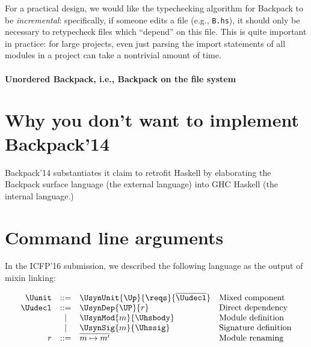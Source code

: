 For a practical design, we would like the typechecking
algorithm for Backpack to be \emph{incremental}: specifically, if
someone edits a file (e.g., \verb|B.hs|), it should only be
necessary to retypecheck files which ``depend'' on this file.
This is quite important in practice: for large projects, even
just parsing the import statements of all modules in a project
can take a nontrivial amount of time.

\paragraph{Unordered Backpack, i.e., Backpack on the file system}

\section{Why you don't want to implement Backpack'14}


Backpack'14 substantiates it claim to retrofit Haskell by elaborating
the Backpack surface language (the external language) into
GHC Haskell (the internal language.)

\section{Command line arguments}

\noindent
In the ICFP'16 submission, we described the following language as the
output of mixin linking:

\[
\begin{array}{rcll}
  \Uunit &::=& \UsynUnit{\Up}{\reqs}{\overline{\Uudecl}} & \text{Mixed component} \\
  \Uudecl &::=& \UsynDep{\UP}{r} & \text{Direct dependency} \\
          &|&   \UsynMod{m}{\Uhsbody} & \text{Module definition} \\
          &|&   \UsynSig{m}{\Uhssig} & \text{Signature definition} \\
  r   &::=& \overline{m \mapsto m'} & \text{Module renaming} \\
\end{array}
\]

